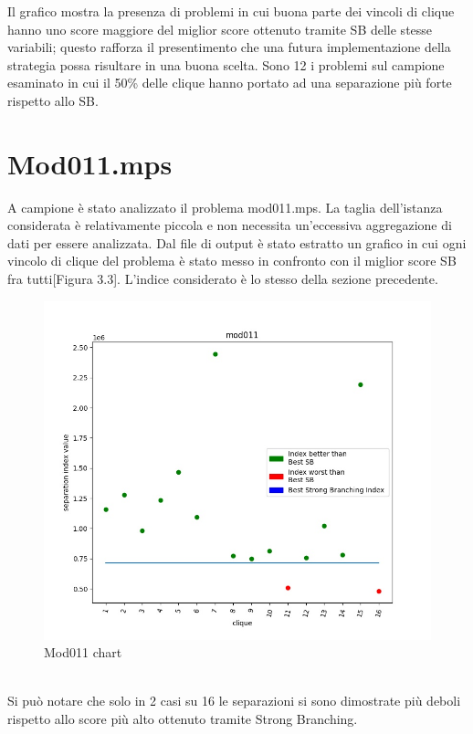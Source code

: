 \documentclass[12pt,a4paper,twoside,openright]{book}
\begin{document}
Il grafico mostra la presenza di problemi in cui buona parte dei vincoli di clique hanno uno score maggiore del miglior
score ottenuto tramite SB delle stesse variabili; questo rafforza il presentimento che una futura implementazione
della strategia possa risultare in una buona scelta. Sono 12 i problemi sul campione esaminato in cui il 50\% delle clique
hanno portato ad una separazione più forte rispetto allo SB.

\section{Mod011.mps}
A campione è stato analizzato il problema mod011.mps. La taglia dell'istanza considerata è relativamente piccola
e non necessita un'eccessiva aggregazione di dati per essere analizzata. Dal file di output è stato estratto un grafico
in cui ogni vincolo di clique del problema è stato messo in confronto con il miglior score SB fra tutti[Figura 3.3]. L'indice considerato è lo stesso 
della sezione precedente.\\
\begin{figure}[ht]
    \centering
    \includegraphics [scale = 0.65]{chart_exp1_mod011}
    \caption{Mod011 chart}
    \label{fig:mod011}
\end{figure}\\
Si può notare che solo in 2 casi su 16 le separazioni si sono dimostrate più deboli rispetto allo score
più alto ottenuto tramite Strong Branching. 
\\
\end{document}

